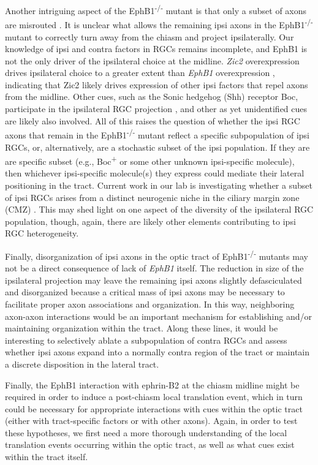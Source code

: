Another intriguing aspect of the EphB1\textsuperscript{-/-} mutant is that only a subset of axons are misrouted \cite{williams2003ephrin,rebsam2009switching}.
It is unclear what allows the remaining ipsi axons in the EphB1\textsuperscript{-/-} mutant to correctly turn away from the chiasm and project ipsilaterally.
Our knowledge of ipsi and contra factors in RGCs remains incomplete, and EphB1 is not the only driver of the ipsilateral choice at the midline.
\emph{Zic2} overexpression drives ipsilateral choice to a greater extent than \emph{EphB1} overexpression \cite{garcia2008zic2}, indicating that Zic2 likely drives expression of other ipsi factors that repel axons from the midline.
Other cues, such as the Sonic hedgehog (Shh) receptor Boc, participate in the ipsilateral RGC projection \cite{fabre2010segregation}, and other as yet unidentified cues are likely also involved.
All of this raises the question of whether the ipsi RGC axons that remain in the EphB1\textsuperscript{-/-} mutant reflect a specific subpopulation of ipsi RGCs, or, alternatively, are a stochastic subset of the ipsi population.
If they are are specific subset (e.g., Boc\textsuperscript{+} or some other unknown ipsi-specific molecule), then whichever ipsi-specific molecule(s) they express could mediate their lateral positioning in the tract.
Current work in our lab is investigating whether a subset of ipsi RGCs arises from a distinct neurogenic niche in the ciliary margin zone (CMZ) \cite{marcucci2016ciliary}.
This may shed light on one aspect of the diversity of the ipsilateral RGC population, though, again, there are likely other elements contributing to ipsi RGC heterogeneity.

Finally, disorganization of ipsi axons in the optic tract of EphB1\textsuperscript{-/-} mutants may not be a direct consequence of lack of \emph{EphB1} itself.
The reduction in size of the ipsilateral projection may leave the remaining ipsi axons slightly defasciculated and disorganized because a critical mass of ipsi axons may be necessary to facilitate proper axon associations and organization.
In this way, neighboring axon-axon interactions would be an important mechanism for establishing and/or maintaining organization within the tract.
Along these lines, it would be interesting to selectively ablate a subpopulation of contra RGCs and assess whether ipsi axons expand into a normally contra region of the tract or maintain a discrete disposition in the lateral tract.

Finally, the EphB1 interaction with ephrin-B2 at the chiasm midline might be required in order to induce a post-chiasm local translation event, which in turn could be necessary for appropriate interactions with cues within the optic tract (either with tract-specific factors or with other axons).
Again, in order to test these hypotheses, we first need a more thorough understanding of the local translation events occurring within the optic tract, as well as what cues exist within the tract itself.